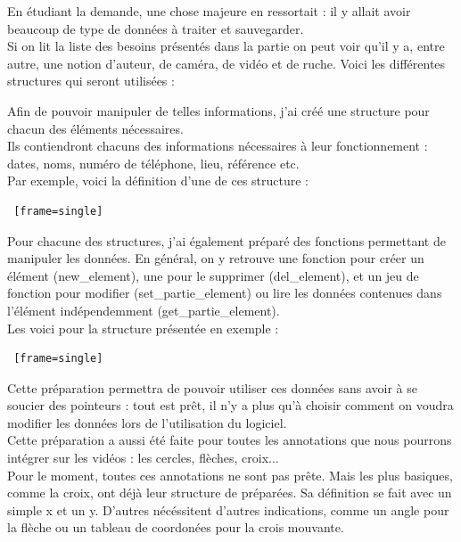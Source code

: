 \documentclass[11pt,french,a4paper]{report}
\begin{document}
En étudiant la demande, une chose majeure en ressortait : il y allait avoir beaucoup de type de données à traiter et sauvegarder. \\
Si on lit la liste des besoins présentés dans la partie %
on peut voir qu'il y a, entre autre, une notion d'auteur, de caméra, de vidéo et de ruche. Voici les différentes structures 
qui seront utilisées : %

Afin de pouvoir manipuler de telles informations, j'ai créé une structure pour chacun des éléments nécessaires. \\
Ils contiendront chacuns des informations nécessaires à leur fonctionnement : dates, noms, numéro de téléphone, lieu, référence etc. \\

Par exemple, voici la définition d'une de ces structure : 
\begin{lstlisting} [frame=single]
\end{lstlisting}

Pour chacune des structures, j'ai également préparé des fonctions permettant de manipuler les données.
En général, on y retrouve une fonction pour créer un élément (new\_element), une pour le supprimer (del\_element),
et un jeu de fonction pour modifier (set\_partie\_element) ou lire les données contenues dans l'élément indépendemment 
(get\_partie\_element). \\
Les voici pour la structure présentée en exemple : 
\begin{lstlisting} [frame=single]
\end{lstlisting}


Cette préparation permettra de pouvoir utiliser ces données sans avoir à se soucier des pointeurs : tout est prêt, il n'y
a plus qu'à choisir comment on voudra modifier les données lors de l'utilisation du logiciel. \\

Cette préparation a aussi été faite pour toutes les annotations que nous pourrons intégrer sur les vidéos : 
les cercles, flèches, croix... \\

Pour le moment, toutes ces annotations ne sont pas prête. Mais les plus basiques, comme la croix, ont déjà leur structure de préparées.
Sa définition se fait avec un simple x et un y. D'autres nécéssitent d'autres indications, comme un angle pour la flèche
ou un tableau de coordonées pour la crois mouvante. \\
\end{document}
